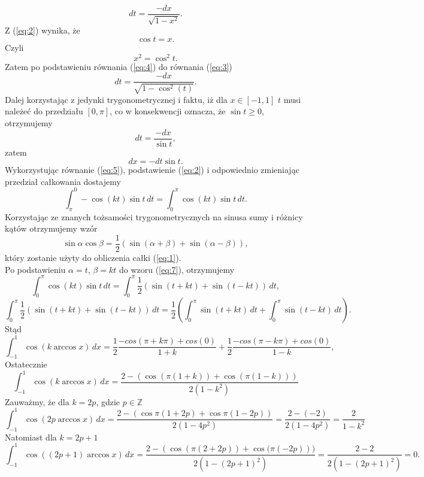 \documentclass[a4paper,12pt]{article}
\begin{document}
\begin{equation} \label{eq:3}
dt = \frac{-dx}{\sqrt{1 - x^2}}.
\end{equation}
Z (\ref{eq:2}) wynika, że 
\[
\cos{t} = x.
\]
Czyli
\begin{equation} \label{eq:4}
x^2 = \cos^2{t}.
\end{equation}
Zatem po podstawieniu równania (\ref{eq:4}) do równania (\ref{eq:3})
\[
dt = \frac{-dx}{\sqrt{1 - \cos^2(t)}}.
\]
Dalej korzystając z jedynki trygonometrycznej i faktu, iż dla $x \in [-1, 1]$ $t$ musi należeć do przedziału $[0, \pi]$, co w konsekwencji oznacza, że $\sin{t} \geq{0}$, otrzymujemy
\[
dt = \frac{-dx}{\sin{t}},
\]
zatem
\begin{equation} \label{eq:5}
dx = -dt\sin{t}.
\end{equation}
Wykorzystując równanie (\ref{eq:5}), podstawienie (\ref{eq:2}) i odpowiednio zmieniając przedział całkowania dostajemy 
\begin{equation} \label{eq:6}
\int_{\pi}^{0} -\cos{(kt)}\sin{t}\,dt = \int_{0}^{\pi} \cos{(kt)}\sin{t}\,dt.
\end{equation}
Korzystając ze znanych tożsamości trygonometrycznych na sinusa sumy i różnicy kątów otrzymujemy wzór
\begin{equation} \label{eq:7}
\sin{\alpha}\cos{\beta} = \frac{1}{2}(\sin{(\alpha + \beta)} + \sin{(\alpha - \beta)}),
\end{equation}
który zostanie użyty do obliczenia całki (\ref{eq:1}).\\
Po podstawieniu $\alpha = t$, $\beta = kt$ do wzoru (\ref{eq:7}), otrzymujemy 
\[
\int_{0}^{\pi} \cos{(kt)}\sin{t}\,dt = \int_{0}^{\pi} \frac{1}{2}(\sin{(t + kt)} + \sin{(t - kt)})\,dt,
\]
\[
\int_{0}^{\pi} \frac{1}{2}(\sin{(t + kt)} + \sin{(t - kt)})\,dt = \frac{1}{2}(\int_{0}^{\pi} \sin{(t + kt)}\,dt +\int_{0}^{\pi} \sin{(t - kt)}\,dt).
\]
Stąd
\[
\int_{-1}^{1} \cos{(k\arccos{x})}\,dx = \frac{1}{2}\frac{-cos(\pi + k\pi) + cos(0)}{1 + k} + \frac{1}{2}\frac{-cos(\pi - k\pi) + cos(0)}{1 - k},
\]
Ostatecznie
\[
\int_{-1}^{1} \cos{(k\arccos{x})}\,dx = \frac{2 - (\cos{(\pi(1 + k))} + \cos{(\pi(1 - k))})}{2(1 - k^2)}
\]
Zauważmy, że dla $k = 2p$, gdzie $p \in \mathbb{Z}$
\[
\int_{-1}^{1} \cos{(2p\arccos{x})}\,dx = \frac{2 - (\cos{\pi(1 + 2p)} + \cos{\pi(1 - 2p)})}{2(1 - 4p^2)} = \frac{2 - (-2)}{2(1 - 4p^2)} = \frac{2}{1 - k^2}
\]
Natomiast dla $k = 2p + 1$
\[
\int_{-1}^{1} \cos{((2p + 1)\arccos{x})}\,dx = \frac{2 - (\cos{(\pi(2 + 2p))} + \cos{(\pi(-2p)}))}{2(1 - (2p + 1)^2)} = \frac{2 - 2}{2(1 - (2p + 1)^2)} = 0.
\]
\filright{\qed}
\end{document}
